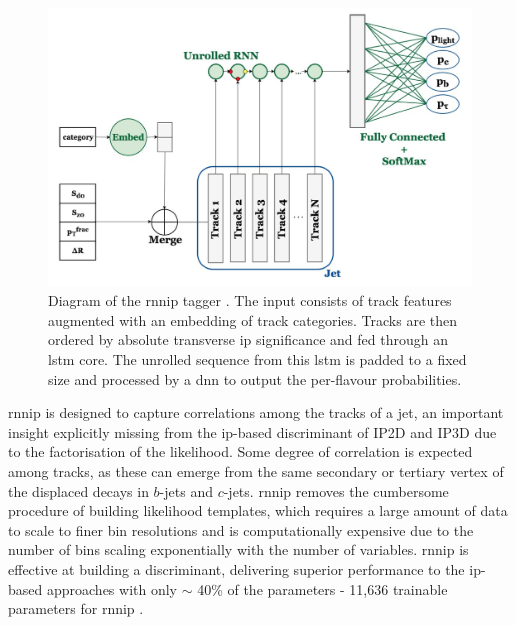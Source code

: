 \begin{figure}[h!]
  \center
  \includegraphics[scale=0.6]{Images/FTAG/rnnip_structure.png}
  \caption{Diagram of the \gls{rnnip} tagger \cite{Paganini:2289214}. The input consists of track features augmented with an embedding of track categories. Tracks are then ordered by absolute transverse \gls{ip} significance and fed through an \gls{lstm} core. The unrolled sequence from this \gls{lstm} is padded to a fixed size and processed by a \gls{dnn} to output the per-flavour probabilities.} 
  \label{fig:rnnipModel}
\end{figure}

\gls{rnnip} is designed to capture correlations among the tracks of a jet, an important insight explicitly missing from the \gls{ip}-based discriminant of IP2D and IP3D due to the factorisation of the likelihood. Some degree of correlation is expected among tracks, as these can emerge from the same secondary or tertiary vertex of the displaced decays in $b$-jets and $c$-jets. \gls{rnnip} removes the cumbersome procedure of building likelihood templates, which requires a large amount of data to scale to finer bin resolutions and is computationally expensive due to the number of bins scaling exponentially with the number of variables. \gls{rnnip} is effective at building a discriminant, delivering superior performance to the \gls{ip}-based approaches with only $\sim$ 40\% of the parameters - 11,636 trainable parameters for \gls{rnnip} \cite{Paganini:2289214}.

